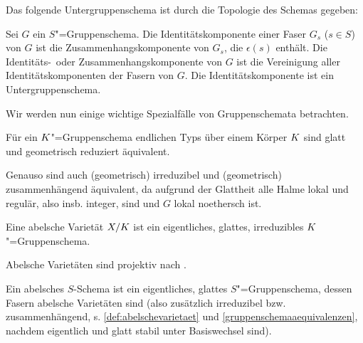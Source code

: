 \documentclass[german, bibliography=totoc]{scrreprt}
\renewcommand*{\optcite}[2][]{}
\begin{document}
Das folgende Untergruppenschema ist durch die Topologie des Schemas
gegeben:
\begin{Definition}[Identitätskomponente]
  \optcite[Remark IV.6.1.2]{silverman2}
  Sei $G$ ein $S$"=Gruppenschema.
  Die Identitätskomponente einer Faser $G_s$ ($s\in S$) von $G$ ist
  die Zusammenhangskomponente von $G_s$, die $\epsilon(s)$ enthält.
  Die Identitäts-~oder Zusammenhangskomponente von $G$ ist
  die Vereinigung aller Identitätskomponenten der Fasern von $G$.
  Die Identitätskomponente ist ein Untergruppenschema.
\end{Definition}

Wir werden nun einige wichtige Spezialfälle von Gruppenschemata
betrachten.
\begin{Bemerkung}\label{gruppenschemaaequivalenzen}
  Für ein $K$"=Gruppenschema endlichen Typs über einem Körper $K$
  sind glatt und geometrisch reduziert äquivalent.
  \optcite[8.5, Excercise 11]{bosch}
  
  Genauso sind auch (geometrisch) irreduzibel und (geometrisch)
  zusammenhängend äquivalent, da aufgrund der Glattheit alle Halme
  lokal und regulär, also insb. integer, sind und $G$ lokal noethersch
  ist.
  \optcite[Exercise 3.16]{wedhorn}\optcite[Corollary 16.51]{wedhorn}
\end{Bemerkung}
\begin{Definition}\label{def:abelschevarietaet}
  Eine abelsche Varietät $X/K$ ist ein eigentliches, glattes,
  irreduzibles $K$"=Gruppenschema.
  \optcite[9.6, Definition 1]{bosch}\optcite[Definition 16.52]{wedhorn}
\end{Definition}
\begin{Bemerkung}\label{thm:abvarietaetprojektiv}
  Abelsche Varietäten sind projektiv nach
  \cite[9.6, Proposition 4]{bosch}.
\end{Bemerkung}

\begin{Definition}
  Ein abelsches $S$-Schema ist ein eigentliches, glattes $S$"=Gruppenschema,
  dessen Fasern abelsche Varietäten sind 
  (also zusätzlich irreduzibel bzw. zusammenhängend,
  s. \ref{def:abelschevarietaet} und \ref{gruppenschemaaequivalenzen},
  nachdem eigentlich und glatt stabil unter Basiswechsel sind).
\end{Definition}
\end{document}
